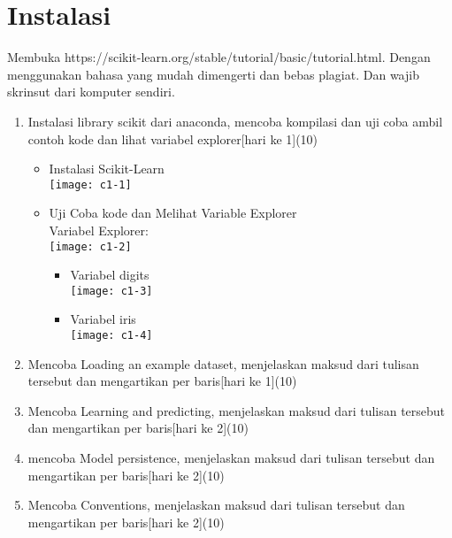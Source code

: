 \section{Instalasi}
Membuka https://scikit-learn.org/stable/tutorial/basic/tutorial.html. Dengan menggunakan bahasa yang mudah dimengerti dan bebas plagiat.
Dan wajib skrinsut dari komputer sendiri.
\begin{enumerate}
	\item
	      Instalasi library scikit dari anaconda, mencoba kompilasi dan uji coba ambil contoh kode dan lihat variabel explorer[hari ke 1](10)\\
	      \begin{itemize}
		      \item
		            Instalasi Scikit-Learn\\
		            \texttt{[image: c1-1]}

		      \item
		            Uji Coba kode dan Melihat Variable Explorer\\
		            
		            Variabel Explorer:\\
		            \texttt{[image: c1-2]}
		            \begin{itemize}
			            \item
			                  Variabel digits\\
			                  \texttt{[image: c1-3]}

			            \item
			                  Variabel iris\\
			                  \texttt{[image: c1-4]}
		            \end{itemize}
	      \end{itemize}


	\item
	      Mencoba Loading an example dataset, menjelaskan maksud dari tulisan tersebut dan mengartikan per baris[hari ke 1](10)
	\item
	      Mencoba Learning and predicting, menjelaskan maksud dari tulisan tersebut dan mengartikan per baris[hari ke 2](10)
	\item
	      mencoba Model persistence, menjelaskan maksud dari tulisan tersebut dan mengartikan per baris[hari ke 2](10)
	\item
	      Mencoba Conventions, menjelaskan maksud dari tulisan tersebut dan mengartikan per baris[hari ke 2](10)
\end{enumerate}


